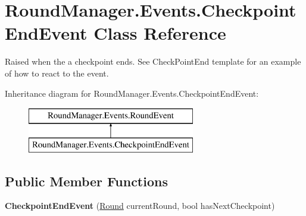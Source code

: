 \hypertarget{class_round_manager_1_1_events_1_1_checkpoint_end_event}{}\section{Round\+Manager.\+Events.\+Checkpoint\+End\+Event Class Reference}
\label{class_round_manager_1_1_events_1_1_checkpoint_end_event}


Raised when the a checkpoint ends. See Check\+Point\+End template for an example of how to react to the event.  


Inheritance diagram for Round\+Manager.\+Events.\+Checkpoint\+End\+Event\+:\begin{figure}[H]
\begin{center}
\leavevmode
\includegraphics[height=2.000000cm]{class_round_manager_1_1_events_1_1_checkpoint_end_event}
\end{center}
\end{figure}
\subsection*{Public Member Functions}
\begin{DoxyCompactItemize}
\item 
\hypertarget{class_round_manager_1_1_events_1_1_checkpoint_end_event_aa7b940607139e746de0a71866c6ff4af}{}{\bfseries Checkpoint\+End\+Event} (\hyperlink{class_round_manager_1_1_round}{Round} current\+Round, bool has\+Next\+Checkpoint)\label{class_round_manager_1_1_events_1_1_checkpoint_end_event_aa7b940607139e746de0a71866c6ff4af}

\end{DoxyCompactItemize}
